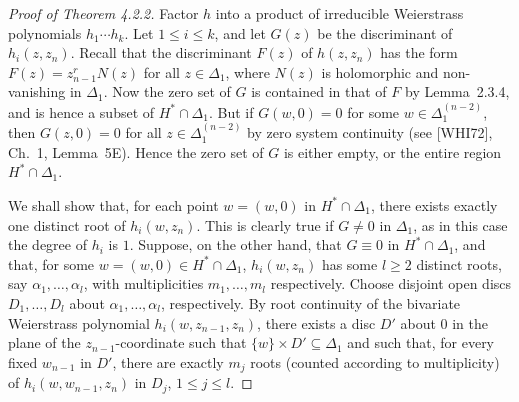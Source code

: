 \documentclass[11pt]{article}
\theoremstyle{plain}
\theoremstyle{definition}
\begin{document}
\begin{proof}[Proof of Theorem 4.2.2]
Factor $h$ into a product of irreducible Weierstrass polynomials
$h_1 \cdots h_k$. Let $1 \le i \le k$, and let $G(z)$ be the
discriminant of $h_i(z, z_n)$. Recall that the discriminant $F(z)$ of
$h(z, z_n)$ has the form $F(z) = z_{n-1}^r N(z)$ for all
$z \in \Delta_1$, where $N(z)$ is holomorphic and non-vanishing in
$\Delta_1$. Now the zero set of $G$ is contained in that of $F$ by
Lemma~2.3.4, and is hence a subset of $H^* \cap \Delta_1$. But if
$G(w, 0) = 0$ for some $w \in \Delta_1^{(n-2)}$, then $G(z, 0) = 0$
for all $z \in \Delta_1^{(n-2)}$ by zero system continuity (see
[WHI72], Ch.~1, Lemma~5E). Hence the zero set of $G$ is either
empty, or the entire region $H^* \cap \Delta_1$.

We shall show that, for each point $w = (w, 0)$ in $H^* \cap \Delta_1$,
there exists exactly one distinct root of $h_i(w, z_n)$. This is
clearly true if $G \ne 0$ in $\Delta_1$, as in this case the degree of
$h_i$ is $1$. Suppose, on the other hand, that $G \equiv 0$ in
$H^* \cap \Delta_1$, and that, for some
$w = (w, 0) \in H^* \cap \Delta_1$, $h_i(w, z_n)$ has some $l \ge 2$
distinct roots, say $\alpha_1, \ldots, \alpha_l$, with multiplicities
$m_1, \ldots, m_l$ respectively. Choose disjoint open discs
$D_1, \ldots, D_l$ about $\alpha_1, \ldots, \alpha_l$, respectively.
By root continuity of the bivariate Weierstrass polynomial
$h_i(w, z_{n-1}, z_n)$, there exists a disc $D'$ about $0$ in the
plane of the $z_{n-1}$-coordinate such that
$\{w\} \times D' \subseteq \Delta_1$ and such that, for every fixed
$w_{n-1}$ in $D'$, there are exactly $m_j$ roots (counted according
to multiplicity) of $h_i(w, w_{n-1}, z_n)$ in $D_j$, $1 \le j \le l$.


\end{proof}
\end{document}
